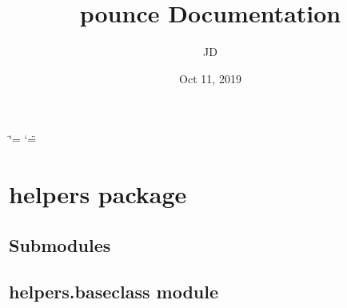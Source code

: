 \documentclass[letterpaper,10pt,english]{sphinxmanual}
\title{pounce Documentation}
\date{Oct 11, 2019}
\author{JD}
\begin{document}
\ifdefined\shorthandoff
  \ifnum\catcode`\=\string=\active\shorthandoff{=}\fi
  \ifnum\catcode`\"=\active{}\fi
\fi

\pagestyle{empty}
\sphinxmaketitle
\pagestyle{plain}
\sphinxtableofcontents
\pagestyle{normal}
\label{\detokenize{index::doc}}



\chapter{helpers package}
\label{\detokenize{helpers:helpers-package}}\label{\detokenize{helpers::doc}}

\section{Submodules}
\label{\detokenize{helpers:submodules}}

\section{helpers.baseclass module}
\label{\detokenize{helpers:module-helpers.baseclass}}\label{\detokenize{helpers:helpers-baseclass-module}}
\end{document}

